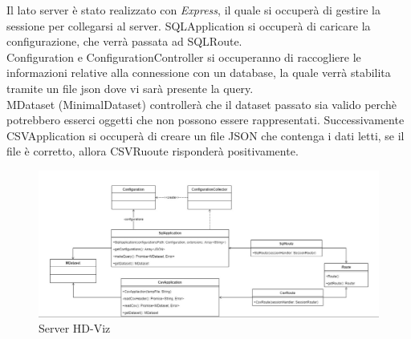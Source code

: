 \documentclass[../manuale_sviluppatore.tex]{subfiles}
\begin{document}
Il lato server è stato realizzato con \emph{Express}, il quale si occuperà di gestire la sessione per collegarsi al server.
SQLApplication si occuperà di caricare la configurazione, che verrà passata ad SQLRoute.\\
Configuration e ConfigurationController si occuperanno di raccogliere le informazioni relative alla connessione con un database, la quale verrà stabilita tramite un file
json dove vi sarà presente la query.\\
MDataset (MinimalDataset) controllerà che il dataset passato sia valido perchè potrebbero esserci oggetti che non possono essere rappresentati. Successivamente
CSVApplication si occuperà di creare un file JSON che contenga i dati letti, se il file è corretto, allora CSVRuoute risponderà positivamente.

\begin{figure}[H]
	\centering
	\includegraphics[width=18cm]{src/img/server.jpg}
	\caption{Server HD-Viz}
\end{figure}
\end{document}
